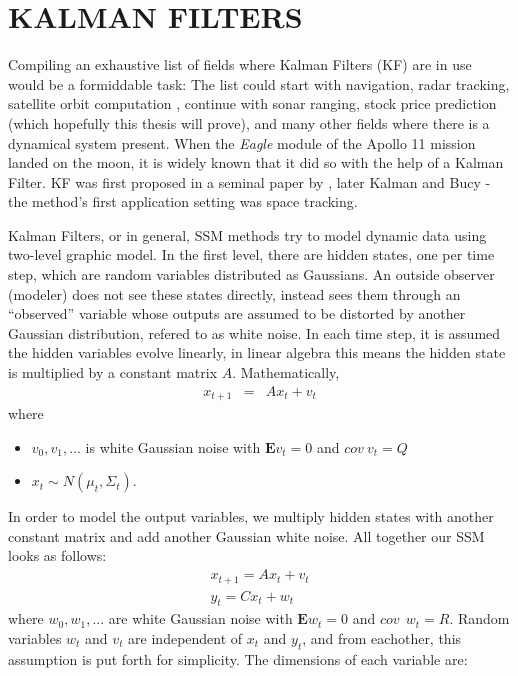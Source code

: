 \chapter{KALMAN FILTERS}

Compiling an exhaustive list of fields where Kalman Filters (KF) are in use
would be a formiddable task: The list could start with navigation, radar
tracking, satellite orbit computation \cite{welling}, continue with sonar
ranging, stock price prediction (which hopefully this thesis will prove), and
many other fields where there is a dynamical system present. When the {\em
  Eagle} module of the Apollo 11 mission landed on the moon, it is widely known
that it did so with the help of a Kalman Filter. KF was first proposed in a
seminal paper by \cite{kalman}, later Kalman and Bucy \cite{kalman2} - the
method's first application setting was space tracking.

Kalman Filters, or in general, SSM methods try to model dynamic data using
two-level graphic model. In the first level, there are hidden states, one per
time step, which are random variables distributed as Gaussians. An outside
observer (modeler) does not see these states directly, instead sees them through
an ``observed'' variable whose outputs are assumed to be distorted by another
Gaussian distribution, refered to as white noise. In each time step, it is
assumed the hidden variables evolve linearly, in linear algebra this means the
hidden state is multiplied by a constant matrix $A$. Mathematically,
\begin{eqnarray*}
x_{t+1} &=& Ax_t + v_t 
\end{eqnarray*}
where
\begin{itemize}
   \item $v_0,v_1,...$ is white Gaussian noise with $\mathbf{E}v_t = 0$ and $cov
   \: v_t = Q$
   \item $x_t \sim N(\mu_t, \Sigma_t)$.
\end{itemize}
In order to model the output variables, we multiply hidden states with another
constant matrix and add another Gaussian white noise. All together our SSM looks
as follows:
\begin{eqnarray}
x_{t+1} = Ax_t + v_t \label{m1}\\
y_t = Cx_t + w_t \label{m2}
\end{eqnarray}
where $w_0,w_1,...$ are white Gaussian noise with $\mathbf{E}w_t = 0$ and $cov
\:\: w_t = R$. Random variables $w_t$ and $v_t$ are independent of $x_t$
and $y_t$, and from eachother, this assumption is put forth for simplicity. The
dimensions of each variable are:

